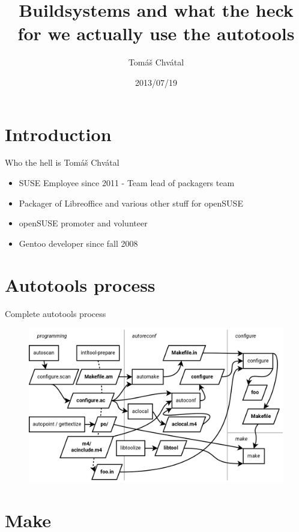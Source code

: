\documentclass{beamer}
\author{Tom\'{a}\v{s} Chv\'{a}tal\newline {\small SUSE Packagers team}}
\title{Buildsystems and what the heck for we actually use the autotools}
\date{2013/07/19}
\begin{document}
\begin{frame}[t,plain]
\titlepage
\end{frame}

\section{Introduction}

\begin{frame}[t]{Who the hell is Tomáš Chvátal}
	\begin{itemize}
	\item SUSE Employee since 2011 - Team lead of packagers team
	\item Packager of Libreoffice and various other stuff for openSUSE
	\item openSUSE promoter and volunteer
	\item Gentoo developer since fall 2008
	\end{itemize}
\end{frame}

\section{Autotools process}

\begin{frame}{Complete autotools process}
	\begin{figure}
	\includegraphics[width= 1.0\linewidth]{autotools.png}
	\end{figure}
\end{frame}

\section{Make}
\end{document}
